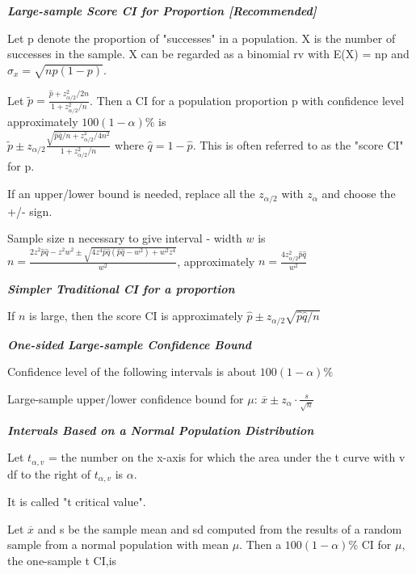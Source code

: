 \documentclass{article}
\newcommand{\smalltitle}[1]{
	\noindent
	\textbf{\textit{#1}}
}
\newcommand{\properframed}[1]{
	{
		\centering
		\vspace{-2 ex}
		\begin{framed}
			\vspace{-1.5 ex}
			#1
			\vspace{-1.5 ex}
		\end{framed}
		\vspace{-2 ex}
	}
}
\begin{document}
	\smalltitle{Large-sample Score CI for Proportion [Recommended]}
	
	Let p denote the proportion of "successes" in a population. X is the number of successes in the sample. X can be regarded as a binomial rv with E(X) = np and $\sigma_x = \sqrt{np(1-p)}$.
	
	Let $\tilde { p } = \frac { \hat { p } + z _ { \alpha / 2 } ^ { 2 } / 2 n } { 1 + z _ { \alpha / 2 } ^ { 2 } / n }$. Then a CI for a population proportion p with confidence level approximately $100(1-\alpha)\%$ is \\
	$\tilde { p } \pm z _ { \alpha / 2 } \frac { \sqrt { \hat { p } \hat { q } / n + z _ { \alpha / 2 } ^ { 2 } / 4 n ^ { 2 } } } { 1 + z _ { \alpha / 2 } ^ { 2 } / n }$ where $\hat{ q } = 1 - \hat{ p }$. This is often referred to as the "score CI" for p.
	
	If an upper/lower bound is needed, replace all the $z_{\alpha/2}$ with $z_{\alpha}$ and choose the +/- sign.
	
	
	Sample size n necessary to give interval - width $w$ is \\
	$n = \frac { 2 z ^ { 2 } \hat { p } \hat { q } - z ^ { 2 } w ^ { 2 } \pm \sqrt { 4 z ^ { 4 } \hat { p } \hat { q } \left( \hat { p } \hat { q } - w ^ { 2 } \right) + w ^ { 2 } z ^ { 4 } } } { w ^ { 2 } }$, approximately $n = \frac { 4 z_{\alpha/2} ^ { 2 } \hat { p } \hat { q } } { w ^ { 2 } }$
	
	\smalltitle{Simpler Traditional CI for a proportion}
	
	\noindent
	If $n$ is large, then the score CI is approximately $\hat { p } \pm z _ { \alpha / 2 } \sqrt { \hat { p } \hat { q } / n }$
	
	\smalltitle{One-sided Large-sample Confidence Bound}
	
	\noindent
	Confidence level of the following intervals is about $100(1-\alpha)\%$
	
	\noindent
	Large-sample upper/lower confidence bound for $\mu$: $\overline { x } \pm z _ { \alpha } \cdot \frac { s } { \sqrt { n } }$
	
	
	\smalltitle{Intervals Based on a Normal Population Distribution}
	
	\properframed{
		\noindent
		Let $t_{\alpha,v}$ = the number on the x-axis for which the area under the t curve with v df to the right of $t_{\alpha,v}$ is $\alpha$. 
		
		It is called "t critical value".
	}
	
	Let $\overline{ x }$ and s be the sample mean and sd computed from the results of a random sample from a normal population with mean $\mu$. Then a $100(1-\alpha)\%$ CI for $\mu$, the one-sample t CI,is
	
\end{document}
